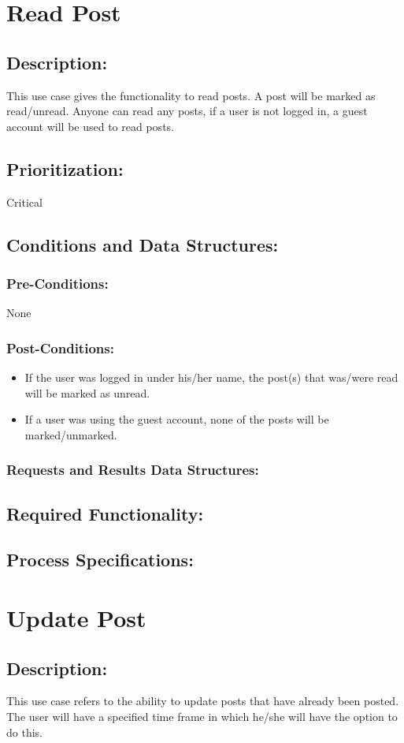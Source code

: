 \documentclass[a4paper,11pt]{article}
\begin{document}
\section{Read Post}
\subsection*{Description:}This use case gives the functionality to read posts. A post will be marked as read/unread. Anyone can read any posts, if a user is not logged in, a guest account will be used to read posts.
\subsection{Prioritization:} Critical
\subsection{Conditions and Data Structures:}
\subsubsection*{Pre-Conditions:}None
\subsubsection*{Post-Conditions:}
\begin{itemize}
	\item If the user was logged in under his/her name, the post(s) that was/were read will be marked as unread.
	\item If a user was using the guest account, none of the posts will be marked/unmarked.
\end{itemize}
\subsubsection*{Requests and Results Data Structures:}
\subsection{Required Functionality:} 
\subsection{Process Specifications:} 

\section{Update Post}
\subsection*{Description:}This use case refers to the ability to update posts that have already been posted. The user will have a specified time frame in which he/she will have the option to do this.  
\end{document}
